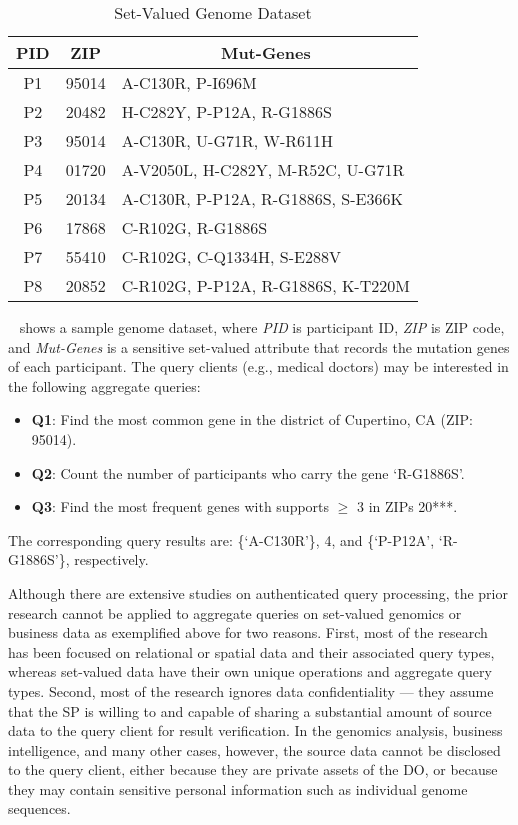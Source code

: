 \begin{table}[t]
  \centering
  \begin{tabular}{ccl}
    \toprule
    \textbf{PID} & \textbf{ZIP} & \multicolumn{1}{c}{\textbf{Mut-Genes}}\\
    \midrule
    P1&95014&A-C130R, P-I696M\\
    P2&20482&H-C282Y, P-P12A, R-G1886S \\
    P3&95014&A-C130R, U-G71R, W-R611H\\
    P4&01720&A-V2050L, H-C282Y, M-R52C, U-G71R\\
    P5&20134&A-C130R, P-P12A, R-G1886S, S-E366K\\
    P6&17868& C-R102G, R-G1886S\\
    P7&55410&C-R102G, C-Q1334H, S-E288V\\
    P8&20852&C-R102G, P-P12A, R-G1886S, K-T220M\\
    \bottomrule
  \end{tabular}
  \caption{Set-Valued Genome Dataset}\label{tab:intro:sample_pgp}
\end{table}

\begin{example}~\label{example:intro:pgp}
   shows a sample genome dataset, where \emph{PID} is participant ID, \emph{ZIP} is ZIP code, and \emph{Mut-Genes} is a sensitive set-valued attribute that records the mutation genes of each participant. The query clients (e.g., medical doctors) may be interested in the following aggregate queries:
    \begin{itemize}
      \item \textbf{Q1}: Find the most common gene in the district of Cupertino, CA (ZIP\@: 95014).
      \item \textbf{Q2}: Count the number of participants who carry the gene `R-G1886S'.
      \item \textbf{Q3}: Find the most frequent genes with supports $\ge$ 3 in ZIPs 20***.
    \end{itemize}
    The corresponding query results are: \{`A-C130R'\}, 4, and \{`P-P12A', `R-G1886S'\}, respectively.
\end{example}

Although there are extensive studies on authenticated query processing, the prior research cannot be applied to aggregate queries on set-valued genomics or business data as exemplified above for two reasons. First, most of the research has been focused on relational or spatial data and their associated query types, whereas set-valued data have their own unique operations and aggregate query types. Second, most of the research ignores data confidentiality --- they assume that the SP is willing to and capable of sharing a substantial amount of source data to the query client for result verification. In the genomics analysis, business intelligence, and many other cases, however, the source data cannot be disclosed to the query client, either because they are private assets of the DO, or because they may contain sensitive personal information such as individual genome sequences.

